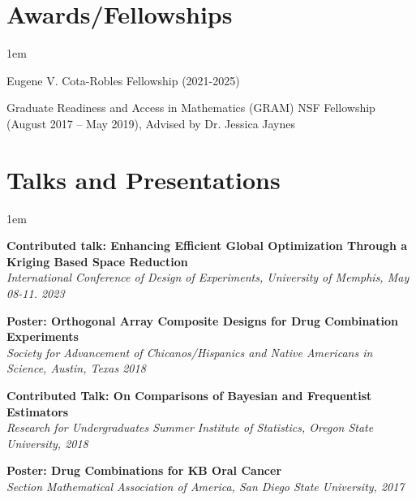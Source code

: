 \documentclass[margin,line]{res}
\newenvironment{list1}{
  \begin{list}{\ding{113}}{
      \setlength{\itemsep}{0in}
      \setlength{\parsep}{0in} \setlength{\parskip}{0in}
      \setlength{\topsep}{0in} \setlength{\partopsep}{0in} 
      \setlength{\leftmargin}{0.20in}}}{\end{list}}
\begin{document}
\begin{resume}
\vspace{2ex}

\section{\sc Awards/\newline Fellowships}
\begin{list1}
\itemsep1em
\item[] Eugene V. Cota-Robles Fellowship (2021-2025)
\item[] Graduate Readiness and Access in Mathematics (GRAM) NSF Fellowship (August 2017 -- May 2019), Advised by Dr. Jessica Jaynes 
\end{list1}


\vspace{2ex}


\section{\sc Talks and Presentations}
\begin{list1}
\itemsep1em
\item[] \textbf{Contributed talk: Enhancing Efficient Global Optimization Through a Kriging Based Space Reduction} \\
\textit{International Conference of Design of Experiments, University of Memphis, May 08-11. 2023}
\item[] \textbf{Poster: Orthogonal Array Composite Designs for Drug Combination Experiments}\\
\textit{Society for Advancement of Chicanos/Hispanics and Native Americans in Science, Austin, Texas 2018}
\item[] \textbf{Contributed Talk: On Comparisons of Bayesian and Frequentist Estimators} \\
\textit{Research for Undergraduates Summer Institute of Statistics, Oregon State University, 2018}
\item[] \textbf{Poster: Drug Combinations for KB Oral Cancer}\\
\textit{Section Mathematical Association of America, San Diego State University, 2017}
\end{list1}



\newpage



\end{resume}
\end{document}
